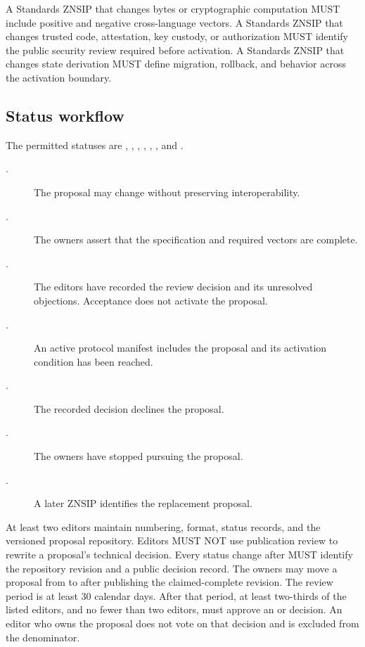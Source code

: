 A Standards ZNSIP that changes bytes or cryptographic computation MUST include positive and negative cross-language vectors.
A Standards ZNSIP that changes trusted code, attestation, key custody, or authorization MUST identify the public security review required before activation.
A Standards ZNSIP that changes state derivation MUST define migration, rollback, and behavior across the activation boundary.

\subsection{Status workflow}

The permitted statuses are , , , , , , and .

\begin{description}
  \item[.] The proposal may change without preserving interoperability.
  \item[.] The owners assert that the specification and required vectors are complete.
  \item[.] The editors have recorded the review decision and its unresolved objections.
  Acceptance does not activate the proposal.
  \item[.] An active protocol manifest includes the proposal and its activation condition has been reached.
  \item[.] The recorded decision declines the proposal.
  \item[.] The owners have stopped pursuing the proposal.
  \item[.] A later ZNSIP identifies the replacement proposal.
\end{description}

At least two editors maintain numbering, format, status records, and the versioned proposal repository.
Editors MUST NOT use publication review to rewrite a proposal's technical decision.
Every status change after  MUST identify the repository revision and a public decision record.
The owners may move a proposal from  to  after publishing the claimed-complete revision.
The review period is at least 30 calendar days.
After that period, at least two-thirds of the listed editors, and no fewer than two editors, must approve an  or  decision.
An editor who owns the proposal does not vote on that decision and is excluded from the denominator.

